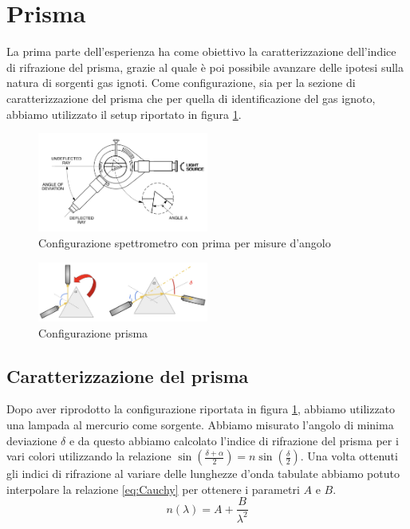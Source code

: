 \documentclass[letterpaper,12pt]{article}
\begin{document}
\section{Prisma}
La prima parte dell'esperienza ha come obiettivo la caratterizzazione dell'indice di rifrazione del prisma, 
grazie al quale è poi possibile avanzare delle ipotesi sulla natura di sorgenti gas ignoti. Come configurazione, sia per
la sezione di caratterizzazione del prisma che per quella di identificazione del gas ignoto, abbiamo utilizzato il setup
riportato in figura \ref{fig:SetupPrisma}.
\begin{figure}[h!]
	\centering
	\includegraphics[width = 0.5\textwidth]{SetupIniziale.jpeg}
	\caption{Configurazione spettrometro con prima per misure d'angolo}
	\label{fig:SetupPrisma}
\end{figure}

\begin{figure}[h!]
	\centering
	\includegraphics[width = 0.5\textwidth]{Prisma.jpeg}
	\caption{Configurazione prisma}
	\label{fig:Prisma}
\end{figure}


\subsection{Caratterizzazione del prisma}
Dopo aver riprodotto la configurazione riportata in figura \ref{fig:SetupPrisma}, abbiamo utilizzato una lampada al 
mercurio come sorgente. Abbiamo misurato l'angolo di minima deviazione $\delta$ e da questo abbiamo calcolato l'indice 
di rifrazione del prisma per i vari colori utilizzando la relazione $\sin(\frac{\delta + \alpha}{2}) = n \sin(\frac{\delta}{2})$.
Una volta ottenuti gli indici di rifrazione al variare delle lunghezze d'onda tabulate abbiamo potuto interpolare 
la relazione \ref{eq:Cauchy} per ottenere i parametri $A$ e $B$.
\begin{equation}
    n(\lambda) = A + \frac{B}{\lambda^2}
    \label{eq:Cauchy}
\end{equation}
\end{document}
